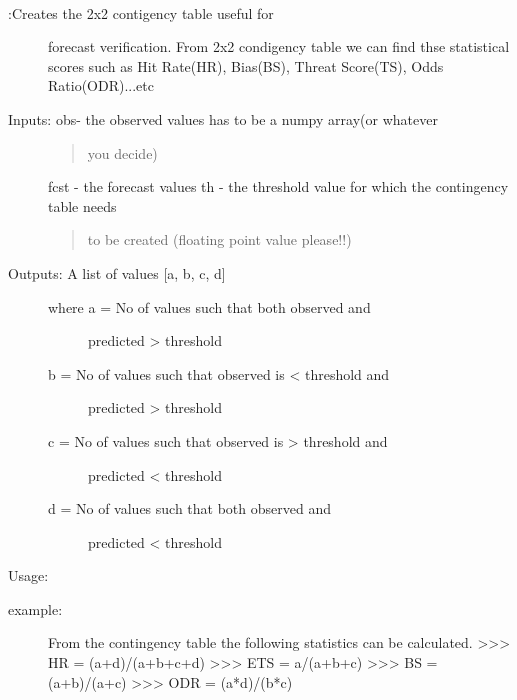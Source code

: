 \documentclass[letterpaper,10pt,english]{sphinxmanual}
\begin{document}
\begin{fulllineitems}
\label{diagnosis:ctgfunction.contingency_table_2x2}~\begin{description}
\item[{{\hyperref[diagnosis:ctgfunction.contingency_table_2x2]{}}:Creates the 2x2 contigency table useful for}] \leavevmode
forecast verification. From 2x2 condigency table we can find thse
statistical scores such as Hit Rate(HR), Bias(BS),
Threat Score(TS), Odds Ratio(ODR)...etc

\item[{Inputs: obs- the observed values has to be a numpy array(or whatever}] \leavevmode\begin{quote}

you decide)
\end{quote}

fcst - the forecast values
th  - the threshold value for which the contingency table needs
\begin{quote}

to be created (floating point value please!!)
\end{quote}

\item[{Outputs: A list of values {[}a, b, c, d{]}}] \leavevmode\begin{description}
\item[{where a = No of values such that both observed and}] \leavevmode
predicted \textgreater{} threshold

\item[{b = No of values such that observed is \textless{} threshold and}] \leavevmode
predicted \textgreater{} threshold

\item[{c = No of values such that observed is \textgreater{} threshold and}] \leavevmode
predicted \textless{} threshold

\item[{d = No of values such that both observed and}] \leavevmode
predicted \textless{} threshold

\end{description}

\end{description}

Usage:
\begin{description}
\item[{example:}] \leavevmode
From the contingency table the following statistics can be
calculated.
\textgreater{}\textgreater{}\textgreater{} HR = (a+d)/(a+b+c+d)
\textgreater{}\textgreater{}\textgreater{} ETS = a/(a+b+c)
\textgreater{}\textgreater{}\textgreater{} BS = (a+b)/(a+c)
\textgreater{}\textgreater{}\textgreater{} ODR = (a*d)/(b*c)


\end{description}
\end{fulllineitems}
\end{document}
